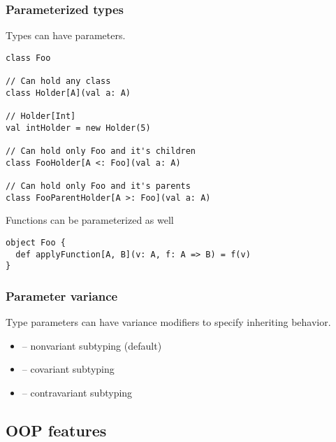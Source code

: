 \documentclass{beamer}
\begin{document}
\begin{frame}[fragile]
\frametitle{Parameterized types}

Types can have parameters.

\begin{lstlisting}
class Foo

// Can hold any class
class Holder[A](val a: A)

// Holder[Int]
val intHolder = new Holder(5)

// Can hold only Foo and it's children
class FooHolder[A <: Foo](val a: A)

// Can hold only Foo and it's parents
class FooParentHolder[A >: Foo](val a: A)
\end{lstlisting}

Functions can be parameterized as well

\begin{lstlisting}
object Foo {
  def applyFunction[A, B](v: A, f: A => B) = f(v)
}
\end{lstlisting}

\end{frame}

\begin{frame}[fragile]
\frametitle{Parameter variance}
Type parameters can have variance modifiers to specify inheriting behavior.
\begin{itemize}
\item {} -- nonvariant subtyping (default)
\item {} -- covariant subtyping
\item {} -- contravariant subtyping
\end{itemize}

\end{frame}

\subsection{OOP features}
\end{document}
